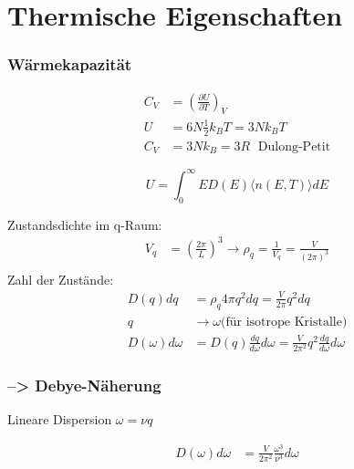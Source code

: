 \section{Thermische Eigenschaften}

\subsubsection*{Wärmekapazität}

\begin{equation*}
    \begin{aligned}
        C_V &= \left(\frac{\partial U}{\partial T}\right)_V \\
        U &= 6N \frac{1}{2} k_B T = 3 N k_B T \\
        C_V &= 3Nk_B = 3R \; \text{ Dulong-Petit}
    \end{aligned}
\end{equation*}

\begin{equation*}
    U = \int_0^\infty E D(E) \langle n(E,T) \rangle dE
\end{equation*}

Zustandsdichte im q-Raum:
\begin{equation*}
    \begin{aligned}
        V_q &= \left(\frac{2 \pi}{L}\right)^3 \rightarrow \rho_q = \frac{1}{V_q} = \frac{V}{(2\pi)^3} \\
    \end{aligned}
\end{equation*}
Zahl der Zustände:
\begin{equation*}
    \begin{aligned}
        D(q) dq &= \rho_q 4 \pi q^2 dq = \frac{V}{2 \pi} q^2 dq \\
        q & \rightarrow \omega \text{(für isotrope Kristalle)} \\
        D(\omega) d\omega &= D(q) \frac{dq}{d\omega} d\omega = \frac{V}{2 \pi^2} q^2 \frac{dq}{d \omega} d\omega
    \end{aligned}
\end{equation*}

\subsubsection*{--> Debye-Näherung}
Lineare Dispersion $\omega = \nu q$

\begin{equation*}
    \begin{aligned}
        D(\omega)d \omega &= \frac{V}{2 \pi^2} \frac{\omega^3}{\nu^3} d\omega 
    \end{aligned}
\end{equation*}